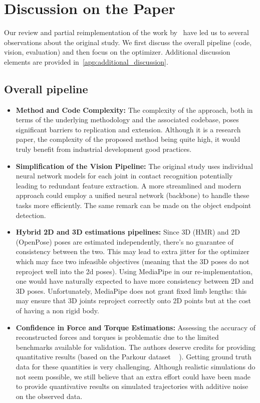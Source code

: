 \section{Discussion on the Paper}
\label{sec:discussion}

Our review and partial reimplementation of the work by~\citet{li2019estimating} have led us to several observations about 
the original study. We first discuss the overall pipeline (code, vision, evaluation) and then focus on the optimizer. 
Additional discussion elements are provided in~\cref{app:additional_discussion}.
\subsection{Overall pipeline}
\begin{itemize}
    \item \textbf{Method and Code Complexity:} The complexity of the approach, both in terms of the underlying methodology and the associated 
    codebase, poses significant barriers to replication and extension. Although it is a research paper, the complexity of the proposed method 
    being quite high, it would truly benefit from industrial development good practices.

    \item \textbf{Simplification of the Vision Pipeline:} The original study uses individual neural network models for each joint in contact recognition
    potentially leading to redundant feature extraction. A more streamlined and modern approach could employ a unified neural network (backbone) to handle 
    these tasks more efficiently. The same remark can be made on the object endpoint detection.

    \item \textbf{Hybrid 2D and 3D estimations pipelines:} Since 3D (HMR) and 2D (OpenPose) poses are estimated independently, there's no
    guarantee of consistency between the two. This may lead to extra jitter for the optimizer which may face two infeasible objectives 
    (meaning that the 3D poses do not reproject well into the 2d poses).
    Using MediaPipe in our re-implementation, one would have naturally expected to have more consistency between 2D and 3D poses. Unfortunately, MediaPipe
    does not grant fixed limb lengths: this may ensure that 3D joints reproject correctly onto 2D points
    but at the cost of having a non rigid body.
    
    \item \textbf{Confidence in Force and Torque Estimations:} Assessing the accuracy of reconstructed forces and torques is problematic due 
    to the limited benchmarks available for validation. The authors deserve credits for providing quantitative results (based on the Parkour dataset ~\cite{maldonado} ).
    Getting ground truth data for these quantities is very challenging. Although realistic simulations do not seem possible, we still believe that an extra
    effort could have been made to provide quantivative results on simulated trajectories with additive noise on the observed data.

\end{itemize}

